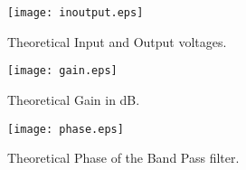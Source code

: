 \begin{figure}[h] 
\centering
\texttt{[image: inoutput.eps]}
\caption{Theoretical Input and Output voltages.}
\label{Fig6: TheoVoltage}
\end{figure}

\begin{figure}[h] 
\centering
\texttt{[image: gain.eps]}
\caption{Theoretical Gain in dB.}
\label{Fig7: TheoGaindB}
\end{figure}

\begin{figure}[h] 
\centering
\texttt{[image: phase.eps]}
\caption{Theoretical Phase of the Band Pass filter.}
\label{Fig8: TheoPhasedB}
\end{figure}

